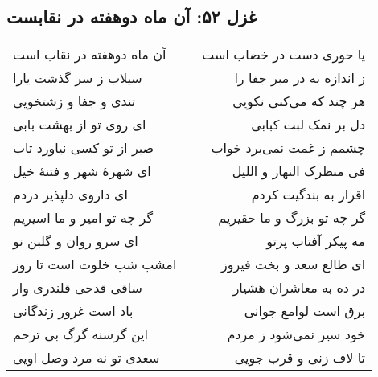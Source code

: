 \begin{center}
\section*{غزل ۵۲: آن ماه دوهفته در نقابست}
\label{sec:052}
\begin{longtable}{l p{0.5cm} r}
آن ماه دوهفته در نقاب است
&&
یا حوری دست در خضاب است
\\
سیلاب ز سر گذشت یارا
&&
ز اندازه به در مبر جفا را
\\
تندی و جفا و زشتخویی
&&
هر چند که می‌کنی نکویی
\\
ای روی تو از بهشت بابی
&&
دل بر نمک لبت کبابی
\\
صبر از تو کسی نیاورد تاب
&&
چشمم ز غمت نمی‌برد خواب
\\
ای شهرهٔ شهر و فتنهٔ خیل
&&
فی منظرک النهار و اللیل
\\
ای داروی دلپذیر دردم
&&
اقرار به بندگیت کردم
\\
گر چه تو امیر و ما اسیریم
&&
گر چه تو بزرگ و ما حقیریم
\\
ای سرو روان و گلبن نو
&&
مه پیکر آفتاب پرتو
\\
امشب شب خلوت است تا روز
&&
ای طالع سعد و بخت فیروز
\\
ساقی قدحی قلندری وار
&&
در ده به معاشران هشیار
\\
باد است غرور زندگانی
&&
برق است لوامع جوانی
\\
این گرسنه گرگ بی ترحم
&&
خود سیر نمی‌شود ز مردم
\\
سعدی تو نه مرد وصل اویی
&&
تا لاف زنی و قرب جویی
\\
\end{longtable}
\end{center}
